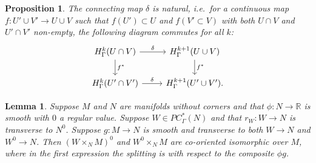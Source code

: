 \documentclass[12pt]{article}
\theoremstyle{plain}
\newtheorem{lemma}[theorem]{Lemma}
\newtheorem{proposition}[theorem]{Proposition}
\theoremstyle{definition}
\theoremstyle{remark}
\newcommand{\R}{\mathbb{R}}
\begin{document}
\begin{proposition}\label{P: natural connection}
	The connecting map $\delta$ is natural, i.e.\ for a continuous map  $f \colon U' \cup V' \to U \cup V$ such that $f(U') \subset U$ and $f(V' \subset V)$ with both $U \cap V$ and $U' \cap V'$ non-empty, the following diagram commutes for all $k$:
	\[
	\begin{tikzcd}
		H^k_\Gamma(U \cap V) \arrow[r, "\delta"] \arrow[d, "f^*"] & H^{k+1}_\Gamma(U \cup V) \arrow[d, "f^*"] \\
		H^k_\Gamma(U' \cap V') \arrow[r, "\delta"] & H^{k+1}_\Gamma(U' \cup V').
	\end{tikzcd}
	\]
\end{proposition}

\begin{lemma}\label{L: cut pullback}
	Suppose $M$ and $N$ are manifolds without corners and that $\phi \colon N \to \R$ is smooth with $0$ a regular value.
	Suppose $W \in PC^*_\Gamma(N)$ and that $r_W \colon W \to N$ is transverse to $N^0$.
	Suppose $g \colon M \to N$ is smooth and transverse to both $W \to N$ and $W^0 \to N$.
	Then $(W \times_N M)^0$ and $W^0 \times_N M$ are co-oriented isomorphic over $M$, where in the first expression the splitting is with respect to the composite $\phi g$.
\end{lemma}
\end{document}
